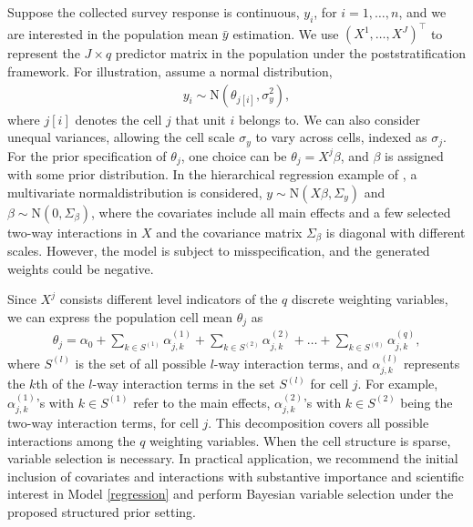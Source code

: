 \documentclass[11pt]{article}
\numberwithin{figure}{section}
\numberwithin{table}{section}
\numberwithin{equation}{section}
\begin{document}
Suppose the collected survey response is continuous, $y_i$, for $i=1,\dots, n$,
and we are interested in the population mean $\bar{y}$ estimation. We use
$(X^1,\dots, X^J)^\top$ to represent the $J\times q$ predictor matrix in the
population under the poststratification framework. For illustration, assume a
normal distribution, \begin{align} \label{normal} y_i \sim
\textrm{N}(\theta_{j[i]}, \sigma_y^2), \end{align} where $j[i]$ denotes the
cell $j$ that unit $i$ belongs to. We can also consider unequal variances,
allowing the cell scale $\sigma_y$ to vary across cells, indexed as $\sigma_j$.
For the prior specification of $\theta_j$, one choice can be
$\theta_j=X^j\beta$, and $\beta$ is assigned with some prior distribution. In
the hierarchical regression example of \cite{gelman07}, a multivariate
normaldistribution is considered, $y\sim \textrm{N}(X\beta, \Sigma_{y})$ and
$\beta \sim \textrm{N}(0,\Sigma_{\beta})$, where the covariates include all
main effects and a few selected two-way interactions in $X$ and the covariance
matrix $\Sigma_{\beta}$ is diagonal with different scales. However, the model
is subject to misspecification, and the generated weights could be negative.
	
Since $X^j$ consists different level indicators of the $q$ discrete weighting
variables, we can express the population cell mean $\theta_j$ as \begin{align}
  \label{regression} \theta_j=\alpha_0 + \sum_{k\in
  S^{(1)}}\alpha_{j,k}^{(1)}+\sum_{k\in
  S^{(2)}}\alpha_{j,k}^{(2)}+\dots+\sum_{k\in S^{(q)}}\alpha_{j,k}^{(q)},
\end{align} where $S^{(l)}$ is the set of all possible $l$-way interaction
terms, and $\alpha^{(l)}_{j,k}$ represents the $k$th of the $l$-way interaction
terms in the set $S^{(l)}$ for cell $j$. For example, $\alpha^{(1)}_{j,k}$'s
with $k\in S^{(1)}$ refer to the main effects, $\alpha^{(2)}_{j,k}$'s with
$k\in S^{(2)}$ being the two-way interaction terms, for cell $j$. This
decomposition covers all possible interactions among the $q$ weighting
variables. When the cell structure is sparse, variable selection is necessary.
In practical application, we recommend the initial inclusion of covariates and
interactions with substantive importance and scientific interest in Model
\eqref{regression} and perform Bayesian variable selection under the proposed
structured prior setting.
\end{document}
